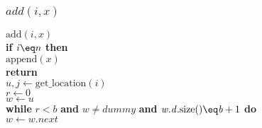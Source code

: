 \documentclass{beamer}
\begin{document}
\begin{frame}[shrink]
\frametitle{$add(i,x)$}
\begin{oframed}
\begin{flushleft}
\hspace*{1em} \ensuremath{\mathrm{add}(\ensuremath{\mathit{i}}, \ensuremath{\mathit{x}})}\\

\hspace*{1em} \hspace*{1em} {\color{black} \textbf{if}} \ensuremath{\ensuremath{\mathit{i}} \eq n} {\color{black} \textbf{then}} \\
\hspace*{1em} \hspace*{1em} \hspace*{1em} \ensuremath{\mathrm{append}(\ensuremath{\mathit{x}})}\\
\hspace*{1em} \hspace*{1em} \hspace*{1em} {\color{black} \textbf{return}}\\
\hspace*{1em} \hspace*{1em} \ensuremath{\ensuremath{\mathit{u}}, \ensuremath{j} \gets  \ensuremath{\mathrm{get\_location}(\ensuremath{\mathit{i}})}}\\
\hspace*{1em} \hspace*{1em} \ensuremath{\ensuremath{\mathit{r}} \gets  \ensuremath{0}}\\
\hspace*{1em} \hspace*{1em} \ensuremath{\ensuremath{\mathit{w}} \gets  \ensuremath{u}}\\
\hspace*{1em} \hspace*{1em} {\color{black} \textbf{while}} \ensuremath{\ensuremath{\mathit{r}} < b} {\color{black} \textbf{and}} \ensuremath{\ensuremath{\mathit{w}} \ne dummy} {\color{black} \textbf{and}} \ensuremath{\ensuremath{\mathit{w}}.\ensuremath{\mathit{d}}.\mathrm{size}() \eq \ensuremath{\mathit{b}}+1} {\color{black} \textbf{do}} \\
\hspace*{1em} \hspace*{1em} \hspace*{1em} \ensuremath{\ensuremath{\mathit{w}} \gets  \ensuremath{\ensuremath{\mathit{w}}.next}}\\

\end{flushleft}
\end{oframed}
\end{frame}
\end{document}
